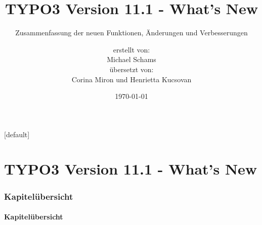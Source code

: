 \documentclass[t]{beamer}
\title{TYPO3 Version 11.1 - What's New}
\subtitle{Zusammenfassung der neuen Funktionen, Änderungen und Verbesserungen}
\author{
	\centerline{erstellt von:}
	\centerline{Michael Schams}
	\centerline{übersetzt von:}
	\centerline{Corina Miron und Henrietta Kucsovan}
	
	
}
\date{\today}
\begin{document}
\sharefont


\begingroup
	[default]
	\begin{frame}
		\titlepage
	\end{frame}
\endgroup


\section*{TYPO3 Version 11.1 - What's New}
\begin{frame}[fragile]
	\frametitle{Kapitelübersicht}
	\framesubtitle{Kapitelübersicht}

	\tableofcontents

\end{frame}

















\end{document}
